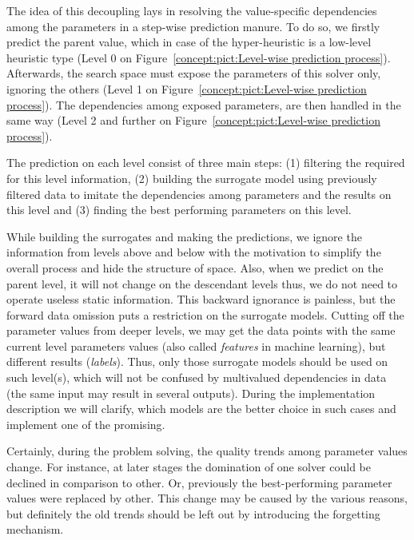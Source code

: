 The idea of this decoupling lays in resolving the value-specific dependencies among the parameters in a step-wise prediction manure. To do so, we firstly predict the parent value, which in case of the hyper-heuristic is a low-level heuristic type (Level 0 on Figure~\ref{concept:pict:Level-wise prediction process}). Afterwards, the search space must expose the parameters of this solver only, ignoring the others (Level 1 on Figure~\ref{concept:pict:Level-wise prediction process}). The dependencies among exposed parameters, are then handled in the same way (Level 2 and further on Figure~\ref{concept:pict:Level-wise prediction process}).

The prediction on each level consist of three main steps: (1) filtering the required for this level information, (2) building the surrogate model using previously filtered data to imitate the dependencies among parameters and the results on this level and (3) finding the best performing parameters on this level.

While building the surrogates and making the predictions, we ignore the information from levels above and below with the motivation to simplify the overall process and hide the structure of space. Also, when we predict on the parent level, it will not change on the descendant levels thus, we do not need to operate useless static information. This backward ignorance is painless, but the forward data omission puts a restriction on the surrogate models. Cutting off the parameter values from deeper levels, we may get the data points with the same current level parameters values (also called \emph{features} in machine learning), but different results (\emph{labels}). Thus, only those surrogate models should be used on such level(s), which will not be confused by multivalued dependencies in data (the same input may result in several outputs). During the implementation description we will clarify, which models are the better choice in such cases and implement one of the promising.

Certainly, during the problem solving, the quality trends among parameter values change. For instance, at later stages the domination of one solver could be declined in comparison to other. Or, previously the best-performing parameter values were replaced by other. This change may be caused by the various reasons, but definitely the old trends should be left out by introducing the forgetting mechanism.

